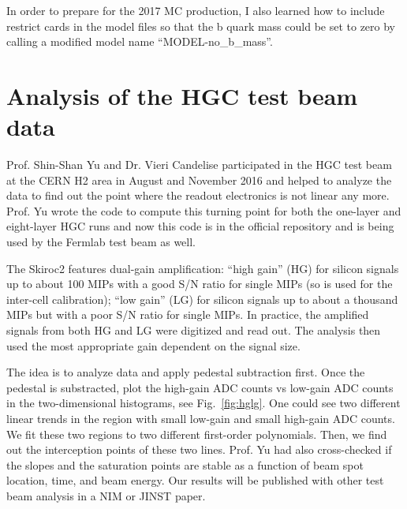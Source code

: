 In order to prepare for the 2017 MC production, I also learned how to include restrict cards in the model files so that the 
b quark mass could be set to zero by calling a modified model name ``MODEL-no\_b\_mass''. 




\section{Analysis of the HGC test beam data}

Prof. Shin-Shan Yu and Dr. Vieri Candelise participated in the HGC test beam at
the CERN H2 area in August and November 2016 and helped to analyze the
data to find out the point where the readout electronics is not linear any
more. Prof. Yu wrote the code to compute this turning point for both the
one-layer and eight-layer HGC runs and now this code is in the official
repository and is being used by the Fermlab test beam as well.

The Skiroc2 features dual-gain amplification: ``high gain'' (HG) for silicon signals up to about 100 MIPs with a good S/N ratio for
single MIPs (so is used for the inter-cell calibration);
``low gain'' (LG) for silicon signals up to about a thousand MIPs but with a poor S/N ratio for single MIPs. In practice, the amplified 
signals
from both HG and LG were digitized and read out. The analysis then used the most appropriate gain dependent on the signal size.


The idea is to analyze data and apply pedestal subtraction first. Once the
pedestal is substracted, plot the high-gain ADC counts vs low-gain ADC
counts in the two-dimensional histograms, see Fig.~\ref{fig:hglg}. One
could see two different linear trends in the region with small low-gain and
small high-gain ADC counts. We fit these two regions to two different
first-order polynomials. Then, we find out the interception points of
these two lines. Prof. Yu had also cross-checked if the slopes and the
saturation points are stable as a function of beam spot location, time,
and beam energy. Our results will be published with other test beam analysis
in a NIM or JINST paper.

